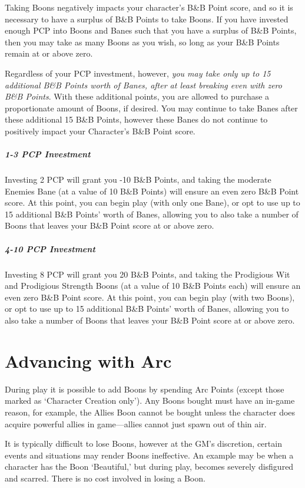 \documentclass[oneside,11pt,english]{book}
\begin{document}
Taking Boons negatively impacts your character's B\&B Point score, and so it is necessary to have a 
surplus of B\&B Points to take Boons. If you have invested enough PCP into Boons and Banes such that 
you have a surplus of B\&B Points, then you may take as many Boons as you wish, so long as your B\&B 
Points remain at or above zero. 


Regardless of your PCP investment, however, \emph{you may take only up to 15 additional B\&B Points worth 
of Banes, after at least breaking even with zero B\&B Points}. With these additional points, you are allowed 
to purchase a proportionate amount of Boons, if desired. You may continue to take Banes after these 
additional 15 B\&B Points, however these Banes do not continue to positively impact your Character’s 
B\&B Point score. 


\subparagraph{1-3 PCP Investment}
Investing 2 PCP will grant you -10 B\&B Points, and taking the moderate Enemies Bane (at a value of 10 B\&B Points) will 
ensure an even zero B\&B Point score. At this point, you can begin play (with only one Bane), or opt to use up to 15 additional 
B\&B Points' worth of Banes, allowing you to also take a number of Boons that leaves your B\&B Point score at or above zero.

\subparagraph{4-10 PCP Investment}
Investing 8 PCP will grant you 20 B\&B Points, and taking the Prodigious Wit and Prodigious Strength Boons (at a value of 10 
B\&B Points each) will ensure an even zero B\&B Point score. At this point, you can begin play (with two Boons), or opt to use up 
to 15 additional B\&B Points’ worth of Banes, allowing you to also take a number of Boons that leaves your B\&B Point score at or above zero. 
\section{Advancing with Arc}
During play it is possible to add Boons by spending Arc Points (except those marked as ‘Character 
Creation only’). Any Boons bought must have an in-game reason, for example, the Allies Boon cannot be 
bought unless the character does acquire powerful allies in game—allies cannot just spawn out of thin air. 
 

It is typically difficult to lose Boons, however at the GM’s discretion, certain events and situations may 
render Boons ineffective. An example may be when a character has the Boon ‘Beautiful,’ but during play, 
becomes severely disfigured and scarred. There is no cost involved in losing a Boon. 
\end{document}
